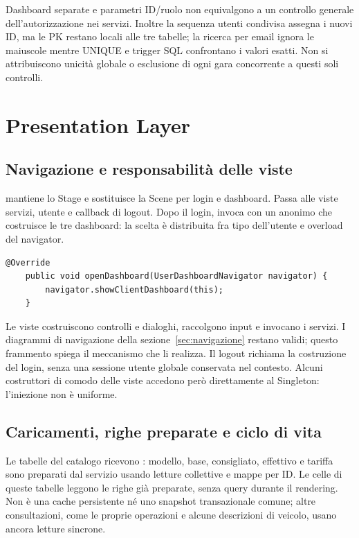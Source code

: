 Dashboard separate e parametri ID/ruolo non equivalgono a un controllo
generale dell'autorizzazione nei servizi. Inoltre la sequenza utenti
condivisa assegna i nuovi ID, ma le PK restano locali alle tre tabelle;
la ricerca per email ignora le maiuscole mentre UNIQUE e trigger SQL
confrontano i valori esatti. Non si attribuiscono unicità globale o
esclusione di ogni gara concorrente a questi soli controlli.

\section{Presentation Layer}\label{sec:impl-presentazione}
\subsection{Navigazione e responsabilità delle viste}
 mantiene lo Stage e sostituisce la Scene per login e dashboard.
Passa alle viste servizi, utente e callback di logout. Dopo il login,
invoca  con un 
anonimo che costruisce le tre dashboard: la scelta è distribuita fra
tipo dell'utente e overload del navigator.

\noindent\begin{minipage}{\linewidth}
\begin{lstlisting}[firstnumber=32,caption={\code{Client.java}: selezione dell'overload del navigator con il tipo concreto.},
  label=lst:navigazione]
    @Override
    public void openDashboard(UserDashboardNavigator navigator) {
        navigator.showClientDashboard(this);
    }
\end{lstlisting}
\end{minipage}


Le viste costruiscono controlli e dialoghi, raccolgono input e invocano i
servizi. I diagrammi di navigazione della sezione~\ref{sec:navigazione}
restano validi; questo frammento spiega il meccanismo che li realizza.
Il logout richiama la costruzione del login, senza una sessione utente
globale conservata nel contesto. Alcuni costruttori di comodo delle viste
accedono però direttamente al Singleton: l'iniezione non è uniforme.

\subsection{Caricamenti, righe preparate e ciclo di vita}
Le tabelle del catalogo ricevono : modello,
base, consigliato, effettivo e tariffa sono preparati dal servizio usando
letture collettive e mappe per ID. Le celle di queste tabelle leggono
le righe già preparate, senza query durante il rendering. Non è una cache
persistente né uno snapshot transazionale comune; altre consultazioni,
come le proprie operazioni e alcune descrizioni di veicolo, usano ancora
letture sincrone.

